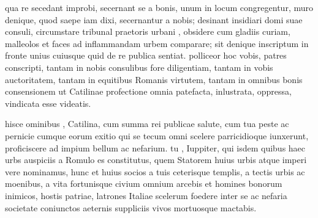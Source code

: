  qua re secedant improbi, secernant se a bonis, unum in locum congregentur, muro denique, quod saepe iam dixi, secernantur a nobis; desinant insidiari domi suae consuli, circumstare tribunal praetoris urbani , obsidere cum gladiis curiam, malleolos et faces ad inflammandam urbem comparare; sit denique inscriptum in fronte unius cuiusque quid de re publica sentiat. polliceor hoc vobis, patres conscripti, tantam in nobis consulibus fore diligentiam, tantam in vobis auctoritatem, tantam in equitibus Romanis virtutem, tantam in omnibus bonis consensionem ut Catilinae profectione omnia patefacta, inlustrata, oppressa, vindicata esse videatis.

 hisce ominibus , Catilina, cum summa rei publicae salute, cum tua peste ac pernicie cumque eorum exitio qui se tecum omni scelere parricidioque iunxerunt, proficiscere ad impium bellum ac nefarium. tu , Iuppiter, qui isdem quibus haec urbs auspiciis a Romulo es constitutus, quem Statorem huius urbis atque imperi vere nominamus, hunc et huius socios a tuis ceterisque templis, a tectis urbis ac moenibus, a vita fortunisque civium omnium arcebis et homines bonorum inimicos, hostis patriae, latrones Italiae scelerum foedere inter se ac nefaria societate coniunctos aeternis suppliciis vivos mortuosque mactabis.
